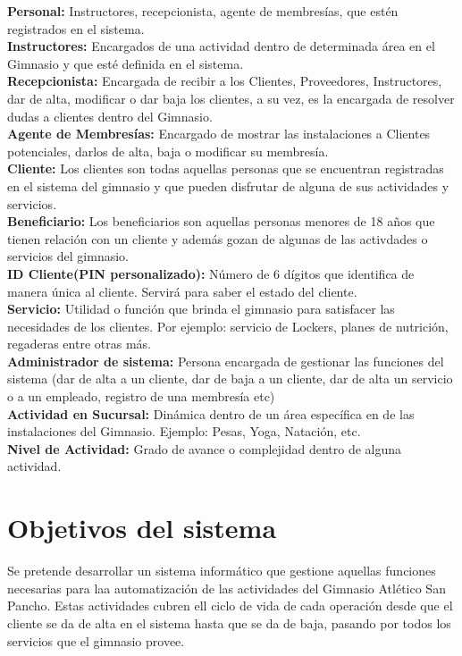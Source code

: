 \textbf{Personal:} Instructores, recepcionista, agente de membres\'ias, que est\'en registrados en el sistema.\\

\textbf{Instructores:} Encargados de una actividad dentro de determinada \'area en el Gimnasio y que est\'e definida en el sistema.\\

\textbf{Recepcionista: }Encargada de recibir a los Clientes, Proveedores, Instructores, dar de alta, modificar o dar baja los clientes, a su vez, es la encargada de resolver dudas a clientes dentro del Gimnasio.\\

\textbf{Agente de Membresías:} Encargado de mostrar las instalaciones a Clientes potenciales, darlos de alta, baja o modificar su membres\'ia.\\

\textbf{Cliente:} Los clientes son todas aquellas personas que se encuentran registradas en el sistema del gimnasio y que pueden disfrutar de alguna de sus actividades y servicios.\\

\textbf{Beneficiario:} Los beneficiarios son aquellas personas menores de 18 años que tienen relación con un cliente y además gozan de algunas de las activdades o servicios del gimnasio.\\

\textbf{ID Cliente(PIN personalizado):} Número  de 6 d\'igitos que identifica de manera \'unica al cliente. Servir\'a para saber el estado del cliente.\\

\textbf{Servicio: }Utilidad o funci\'on que brinda el gimnasio para satisfacer las necesidades de los clientes. Por ejemplo: servicio de Lockers, planes de nutrici\'on, regaderas entre otras m\'as.\\

\textbf{Administrador de sistema: }Persona encargada de gestionar las funciones del sistema (dar de alta a un cliente, dar de baja a un cliente, dar de alta un servicio o a un empleado, registro de una membres\'ia etc)\\

\textbf{Actividad en Sucursal: }Din\'amica dentro de un \'area espec\'ifica en de las instalaciones del Gimnasio. Ejemplo: Pesas, Yoga, Natación, etc.\\

\textbf{Nivel de Actividad:} Grado de avance o complejidad dentro de alguna actividad.

\section{Objetivos del sistema}
Se pretende desarrollar un sistema inform\'atico que gestione aquellas funciones necesarias para laa automatizaci\'on de las actividades del Gimnasio Atl\'etico San Pancho. Estas actividades cubren ell ciclo de vida de cada operaci\'on desde que el cliente se da de alta en el sistema hasta que se da de baja, pasando por todos los servicios que el gimnasio provee.
\clearedoublepage
